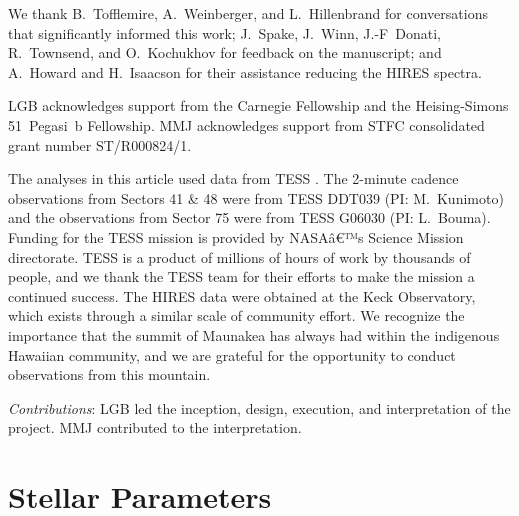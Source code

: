\documentclass[11pt,twocolumn,tighten]{aastex7}
\begin{document}
\begin{acknowledgements}
  We thank B.~Tofflemire, A.~Weinberger, and L.~Hillenbrand for
  conversations that significantly informed this work; J.~Spake,
  J.~Winn, J.-F~Donati, R.~Townsend, and O.~Kochukhov for feedback on the
  manuscript; and A.~Howard and H.~Isaacson for their assistance
  reducing the HIRES spectra.

  LGB acknowledges support from the Carnegie Fellowship and the
  Heising-Simons 51~Pegasi~b Fellowship.
  MMJ acknowledges support from STFC consolidated grant
  number ST/R000824/1.

  The analyses in this article used data from TESS \citep{TESS2min}.  The
  2-minute cadence observations from Sectors 41 \& 48 were from TESS
  DDT039 (PI: M.~Kunimoto) and the observations from Sector 75 were
  from TESS G06030 (PI: L.~Bouma).
  Funding for the TESS mission is provided by NASAâ€™s Science Mission
  directorate.
  TESS is a product of millions of hours of work by thousands of
  people, and we thank the TESS team for their efforts to make the
  mission a continued success.
  The HIRES data were obtained at the Keck Observatory, which exists
  through a similar scale of community effort.
  We recognize the importance that the summit of Maunakea has always
  had within the indigenous Hawaiian community, and we are grateful
  for the opportunity to conduct observations from this mountain.
\end{acknowledgements}

{\it \large Contributions}: 
LGB led the inception, design, execution, and interpretation of the
project.  MMJ contributed to the interpretation.








\appendix

\section{Stellar Parameters}
\label{sec:stparams}
\end{document}
